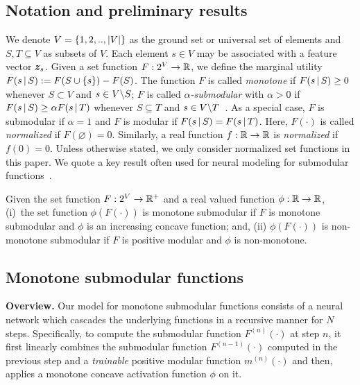 \documentclass{article}
\newcommand{\xhdr}[1]{\noindent\textbf{#1.}}
\renewcommand{\cite}{\citep}
\begin{document}
\subsection{Notation and preliminary results}  

We denote $V=\left\{ 1,2,..,|V|\right\}$ as the ground set or universal set of elements and
$S,T\subseteq V$ as subsets of $V$.  
Each element $s \in V$ may be associated with a feature vector $\bm{z}_{s}$.
Given a set function  $F:2^V \to \mathbb{R}$,  
we define the marginal utility $F(s\,|\, S) :=  F(S\cup \left\{ s\right\})-F(S)$. 
The function $F$ is called \emph{monotone}  if $F(s\,|\, S) \ge 0$ whenever $ S\subset V$ and $s\in V\backslash S$;  $F$ is called \emph{$\alpha$-submodular} with $\alpha >0$ if $F(s\,|\, S) \ge \alpha F(s \,|\, T)$ whenever $S \subseteq  T$ and $s \in V\backslash T$~\cite{hashemi2019submodular,zhang2016submodular,el2020optimal}. As a special case, $F$ is submodular if $\alpha=1$ and $F$ is modular if $F(s\,|\, S) = F(s \,|\, T)$. Here, $F(\cdot)$ is called \emph{normalized} if $F(\varnothing)=0$. Similarly, a real function $f:\mathbb{R}\to\mathbb{R}$ is \emph{normalized} if $f(0)=0$. 
Unless otherwise stated, we only consider normalized set functions in this paper.
We quote a key result often used for neural modeling for submodular functions~\cite{csm2,csm3,lin2011class}.
%
%
\begin{proposition}\label{prop-basic}
Given the set function  $F:2^{V} \to \mathbb{R}^+$ and a real valued  function  $\phi:\mathbb{R}\to\mathbb{R}$, 
(i)~the set function $\phi(F(\cdot))$ is monotone submodular if $F$ is monotone submodular and $\phi$ is an increasing concave function; and,
(ii) $\phi(F(\cdot))$ is non-monotone submodular if $F$ is positive modular and $\phi$ is non-monotone. 
\end{proposition}


\subsection{Monotone submodular functions}  
\label{sec:ms}

\xhdr{Overview} Our model for monotone submodular functions consists of a neural network which  cascades  the underlying  functions in a  recursive  manner for $N$ steps.  Specifically,
to compute the submodular function $F^{(n)}(\cdot)$ at step $n$,
it first linearly combines the submodular function $F^{(n-1)}(\cdot)$ computed in the previous step and a \emph{trainable} positive modular function  $m^{(n)}(\cdot)$  and then, applies a monotone concave activation function $\phi$ on it. 
\end{document}
